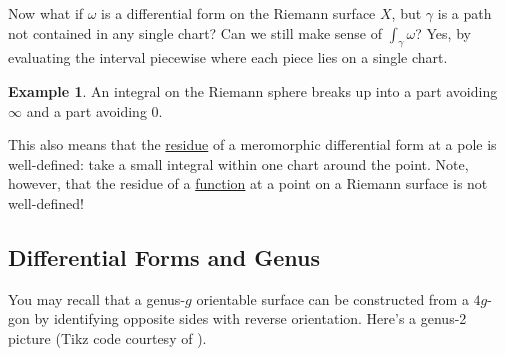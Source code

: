 \documentclass[12pt]{article}
\theoremstyle{definition}
\newtheorem{example}[theorem]{Example}
\theoremstyle{remark}
\begin{document}
Now what if $\omega$ is a differential form on the Riemann surface $X$, but $\gamma$ is a path not contained in any single chart? Can we still make sense of $\int_{\gamma} \omega$? Yes, by evaluating the interval piecewise where each piece lies on a single chart.
\begin{example}
    An integral on the Riemann sphere breaks up into a part avoiding $\infty$ and a part avoiding $0$.
\end{example}
This also means that the \underline{residue} of a meromorphic differential form at a pole is well-defined: take a small integral within one chart around the point. Note, however, that the residue of a \underline{function} at a point on a Riemann surface is not well-defined!
\subsection{Differential Forms and Genus}
You may recall that a genus-$g$ orientable surface can be constructed from a $4g$-gon by identifying opposite sides with reverse orientation. Here's a genus-2 picture (Tikz code courtesy of \cite{Leon}).
\usetikzlibrary{decorations.markings}
\end{document}
